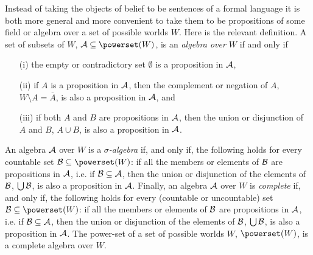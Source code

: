 Instead of taking the objects of belief to be sentences of a formal language it is both more general and more convenient to take them to be propositions of some field or algebra over a set of possible worlds $W$. Here is the relevant definition. A set of subsets of $W$, $\begin{cal}A\end{cal}\subseteq\powerset\!\left(W\right)$, is an \emph{algebra over $W$} if and only if
\begin{enumerate}
\item[(i)] the empty or contradictory set $\emptyset$ is a proposition in $\cal A$,
\item[(ii)] if $A$ is a proposition in $\cal A$, then the complement or negation of $A$, $W\setminus A=\overline{A}$, is also a proposition in $\cal A$, and
\item[(iii)] if both $A$ and $B$ are propositions in $\cal A$, then the union or disjunction of $A$ and $B$, $A\cup B$, is also a proposition in $\cal A$.
\end{enumerate}
An algebra $\cal A$ over $W$ is a \emph{$\sigma$-algebra} if, and only if, the following holds for every countable set $\begin{cal}B\end{cal}\subseteq\powerset\!\left(W\right)$: if all the members or elements of $\begin{cal}B\end{cal}$ are propositions in $\cal A$, i.e. if $\cal B\subseteq A$, then the union or disjunction of the elements of $\cal B$, $\bigcup\cal B$, is also a proposition in $\cal A$. Finally, %
an algebra $\cal A$ over $W$ is \emph{complete} if, and only if, the following holds for every (countable or uncountable) set $\begin{cal}B\end{cal}\subseteq\powerset\!\left(W\right)$: if all the members or elements of $\begin{cal}B\end{cal}$ are propositions in $\cal A$, i.e. if $\cal B\subseteq A$, then the union or disjunction of the elements of $\cal B$, $\bigcup\cal B$, is also a proposition in $\cal A$. The power-set of a set of possible worlds $W$, $\powerset\!\left(W\right)$, is a complete algebra over $W$.
